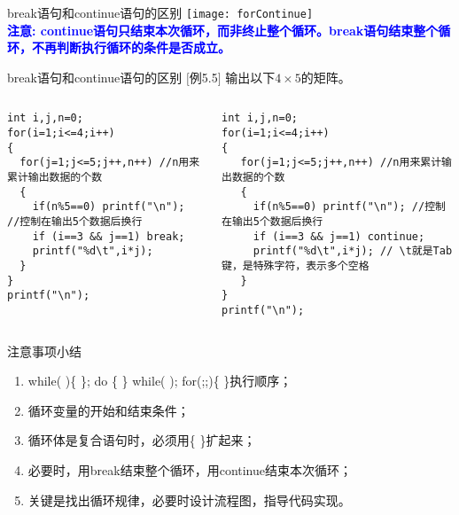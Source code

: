 \begin{frame}{break语句和continue语句的区别}
\texttt{[image: forContinue]}\\
\textbf{\textcolor{blue}{注意: continue语句只结束本次循环，而非终止整个循环。break语句结束整个循环，不再判断执行循环的条件是否成立。}}
\end{frame}

\begin{frame}{break语句和continue语句的区别}
\small $[$例5.5$]$ 输出以下$4\times 5$的矩阵。
\begin{columns}
\begin{lstlisting}
int i,j,n=0;
for(i=1;i<=4;i++)
{
  for(j=1;j<=5;j++,n++) //n用来累计输出数据的个数
  {
    if(n%5==0) printf("\n"); //控制在输出5个数据后换行
    if (i==3 && j==1) break;
    printf("%d\t",i*j);
  } 
} 
printf("\n");  
\end{lstlisting}
\begin{lstlisting}
int i,j,n=0;
for(i=1;i<=4;i++)
{
   for(j=1;j<=5;j++,n++) //n用来累计输出数据的个数
   {
     if(n%5==0) printf("\n"); //控制在输出5个数据后换行
     if (i==3 && j==1) continue;
     printf("%d\t",i*j); // \t就是Tab键，是特殊字符，表示多个空格
   } 
} 
printf("\n");    
\end{lstlisting}
\end{columns}
\end{frame}

\begin{frame}{注意事项小结}
\begin{enumerate}
	\setlength{\itemsep}{.5cm}
	\item while( )\{ \}; do \{ \} while( ); for(;;)\{ \}执行顺序；
	\item 循环变量的开始和结束条件；
	\item 循环体是复合语句时，必须用\{ \}扩起来；
	\item 必要时，用break结束整个循环，用continue结束本次循环；
	\item 关键是找出循环规律，必要时设计流程图，指导代码实现。	
\end{enumerate}
\end{frame}